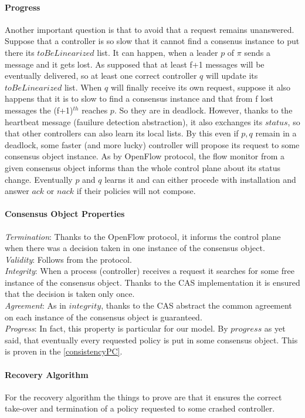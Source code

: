 \documentclass{article}
\theoremstyle{remark}
\begin{document}
\paragraph{Progress} Another important question is that to avoid that a request remains unanswered. Suppose that a controller is so slow that it cannot find a consenus instance to put there its $toBeLinearized$ list. It can happen, when a leader $p$ of $\pi$ sends a message and it gets lost. As supposed that at least f+1 messages will be eventually delivered, so at least one correct controller $q$ will update its $toBeLinearized$ list. When $q$ will finally receive its own request, suppose it also happens that it is to slow to find a consensus instance and that from f lost messages the (f+1)$^{th}$ reaches $p$. So they are in deadlock. However, thanks to the heartbeat message (fauilure detection abstraction), it also exchanges its $status$, so that other controllers can also learn its local lists. By this even if $p,q$ remain in a deadlock, some faster (and more lucky) controller will propose its request to some consensus object instance. As by OpenFlow protocol, the flow monitor from a given consensus object informs than the whole control plane about its status change. Eventually $p$ and $q$ learns it and can either procede with installation and answer $ack$ or $nack$ if their policies will not compose.
\paragraph{Consensus Object Properties}
\emph{Termination}: Thanks to the OpenFlow protocol, it informs the control plane when there was a decision taken in one instance of the consensus object. 
\\
\emph{Validity}: Follows from the protocol.
\\
\emph{Integrity}: When a process (controller) receives a request it searches for some free instance of the consensus object. Thanks to the CAS implementation it is ensured that the decision is taken only once.
\\
\emph{Agreement}: As in $integrity$, thanks to the CAS abstract the common agreement on each instance of the consensus object is guaranteed.
\\
\emph{Progress}: In fact, this property is particular for our model. By $progress$ as yet said, that eventually every requested policy is put in some consensus object. This is proven in the \ref{consistencyPC}.
\paragraph{Recovery Algorithm}
For the recovery algorithm the things to prove are that it ensures the correct take-over and termination of a policy requested to some crashed controller. 
\end{document}

